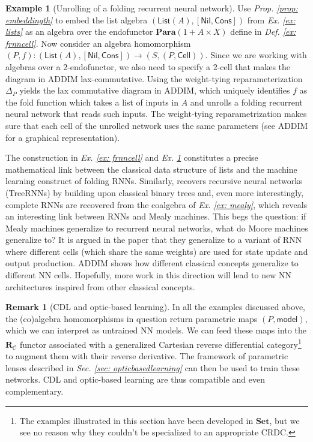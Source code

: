 \documentclass[11pt,a4paper,openright,twoside]{report}
\newcounter{mycounter}
\theoremstyle{plain}
\theoremstyle{definition}
\newtheorem{remark}[mycounter]{Remark}
\newtheorem{example}[mycounter]{Example}
\begin{document}
\begin{example}[Unrolling of a folding recurrent neural network]
  \label{ex: frnnunroll}
  Use \textit{Prop. \ref{prop: embeddingth}} to embed the list algebra $(\mathsf{List}(A), [\mathsf{Nil}, \mathsf{Cons}])$ from \textit{Ex. \ref{ex: lists}} as an algebra over the endofunctor $\mathbf{Para}(1 + A \times X)$ define in \textit{Def. \ref{ex: frnncell}}. Now consider an algebra homomorphism $(P,f): (\mathsf{List}(A), [\mathsf{Nil}, \mathsf{Cons}]) \to (S,(P,\mathsf{Cell}))$. Since we are working with algebras over a $2$-endofunctor, we also need to specify a $2$-cell that makes the diagram in ADDIM lax-commutative. Using the weight-tying reparameterization $\Delta_P$ yields the lax commutative diagram in ADDIM, which uniquely identifies $f$ as the fold function which takes a list of inputs in $A$ and unrolls a folding recurrent neural network that reads such inputs. The weight-tying reparametrization makes sure that each cell of the unrolled network uses the same parameters (see ADDIM for a graphical representation). 
\end{example}


The construction in  \textit{Ex. \ref{ex: frnncell}} and \textit{Ex. \ref{ex: frnnunroll}} constitutes a precise mathematical link between the classical data structure of lists and the machine learning construct of folding RNNs. Similarly, \cite{gavranovicposition} recovers recursive neural networks (TreeRNNs) by building upon classical binary trees and, even more interestingly, complete RNNs are recovered from the coalgebra of \textit{Ex. \ref{ex: mealy}}, which reveals an interesting link between RNNs and Mealy machines. This begs the question: if Mealy machines generalize to recurrent neural networks, what do Moore machines generalize to? It is argued in the paper that they generalize to a variant of RNN where different cells (which share the same weights) are used for state update and output production. ADDIM shows how different classical concepts generalize to different NN cells. Hopefully, more work in this direction will lead to new NN architectures inspired from other classical concepts.

\begin{remark}[CDL and optic-based learning]
  In all the examples discussed above, the (co)algebra homomorphisms in question return parametric maps $(P,\mathsf{model})$, which we can interpret as untrained NN models. We can feed these maps into the $\mathbf{R}_{\mathcal{C}}$ functor associated with a generalized Cartesian reverse differential category\footnote{The examples illustrated in this section have been developed in $\mathbf{Set}$, but we see no reason why they couldn't be specialized to an appropriate CRDC.} to augment them with their reverse derivative. The framework of parametric lenses described in 
  \textit{Sec. \ref{sec: opticbasedlearning}} can then be used to train these networks. CDL and optic-based learning are thus compatible and even complementary.
\end{remark}
\end{document}
